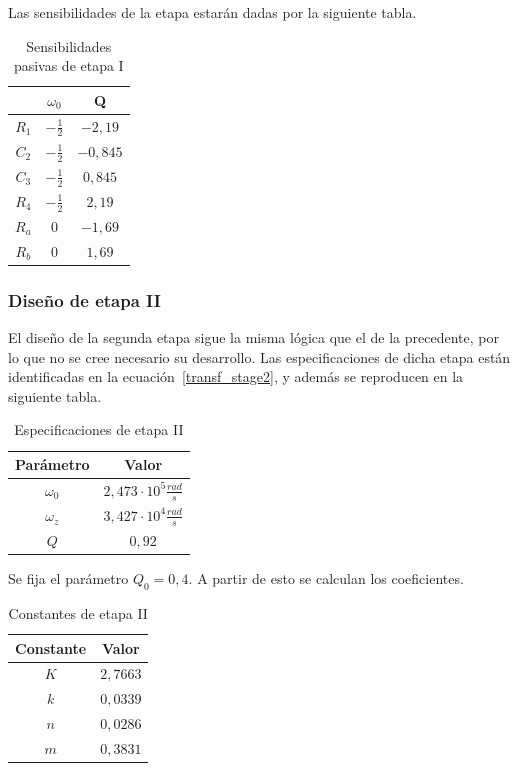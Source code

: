 Las sensibilidades de la etapa estar\'an dadas por la siguiente tabla.

\begin{table}[H]
    \centering
    \begin{tabular}{c | c c}
         & $\omega_0$ & Q\\
        \hline
        $R_1$  & $-\frac{1}{2}$ & $-2,19$ \\
        $C_2$  & $-\frac{1}{2}$ & $-0,845$ \\
        $C_3$  & $-\frac{1}{2}$ & $0,845$\\
        $R_4$  & $-\frac{1}{2}$ & $2,19$ \\
        $R_a$  & $0$ & $-1,69$\\
        $R_b$  & $0$ & $1,69$\\
    \end{tabular}
    \caption{Sensibilidades pasivas de etapa I}
    \label{tabla_sensibilidades_pasivas_stageI}
\end{table}

\subsubsection{Dise\~no de etapa II}

El dise\~no de la segunda etapa sigue la misma l\'ogica que el de la precedente, por lo que no se cree necesario su desarrollo. Las especificaciones de dicha etapa est\'an identificadas en la ecuaci\'on~\ref{transf_stage2}, y adem\'as se reproducen en la siguiente tabla.

\begin{table}[H]
    \centering
    \begin{tabular}{c c}
        Par\'ametro & Valor\\
        \hline
         $\omega_0$ & $2,473 \cdot 10^5 \frac{rad}{s}$ \\
	     $\omega_z$ & $3,427 \cdot 10^4 \frac{rad}{s}$  \\
         $Q$ & $0,92$ \\
    \end{tabular}
    \caption{Especificaciones de etapa II}
    \label{tabla_stageI}
\end{table}

Se fija el par\'ametro $Q_0 = 0,4$. A partir de esto se calculan los coeficientes. 

\begin{table}[H]
    \centering
    \begin{tabular}{c c}
        Constante & Valor\\
        \hline
         $K$ & $2,7663$ \\
	     $k$ & $0,0339$  \\
         $n$ & $0,0286$ \\
         $m$ & $0,3831$ \\
    \end{tabular}
    \caption{Constantes de etapa II}
    \label{tabla_stageII_ctes}
\end{table}

